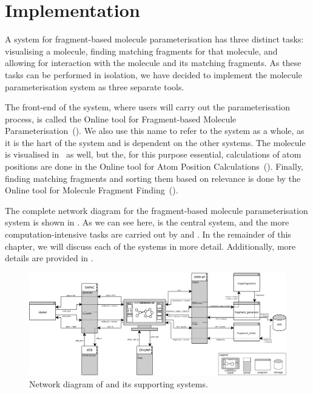 \chapter{Implementation}

\setcounter{topnumber}{1}
\setcounter{bottomnumber}{1}
\setlength{\textfloatsep}{1em}
\renewcommand{\topfraction}{0.9}
\renewcommand{\bottomfraction}{0.9}
\renewcommand{\textfraction}{0.1}

A system for fragment-based molecule parameterisation has three distinct tasks: visualising a molecule, finding matching fragments for that molecule, and allowing for interaction with the molecule and its matching fragments. As these tasks can be performed in isolation, we have decided to implement the molecule parameterisation system as three separate tools.

The front-end of the system, where users will carry out the parameterisation process, is called the Online tool for Fragment-based Molecule Parameterisation~(\oframp). We also use this name to refer to the system as a whole, as it is the hart of the system and is dependent on the other systems. The molecule is visualised in \oframp\ as well, but the, for this purpose essential, calculations of atom positions are done in the Online tool for Atom Position Calculations~(\oapoc). Finally, finding matching fragments and sorting them based on relevance is done by the Online tool for Molecule Fragment Finding~(\omfraf).

The complete network diagram for the fragment-based molecule parameterisation system is shown in . As we can see here, \oframp{} is the central system, and the more computation-intensive tasks are carried out by \oapoc{} and \omfraf{}. In the remainder of this chapter, we will discuss each of the systems in more detail. Additionally, more details are provided in .

\begin{figure}
\center
\includegraphics[width=\textwidth]{img/network_diagram.pdf}
\vspace{1em}
\caption{Network diagram of \oframp{} and its supporting systems.}
\end{figure}



